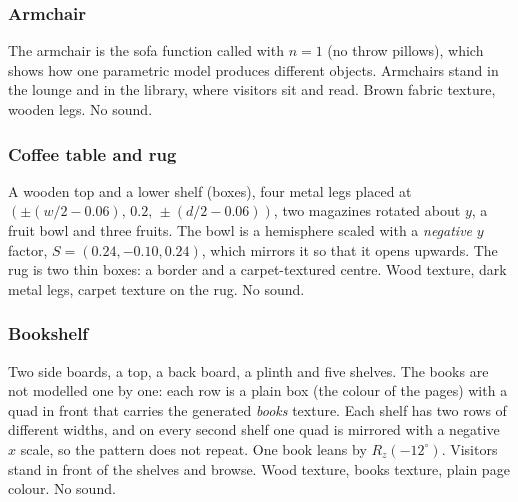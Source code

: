 \subsubsection{Armchair}
 The armchair is the sofa function called with $n=1$ (no throw pillows),
which shows how one parametric model produces different objects. Armchairs stand in the lounge and in the
library, where visitors sit and read.
 Brown fabric texture, wooden legs. No sound.

\subsubsection{Coffee table and rug}
 A wooden top and a lower shelf (boxes), four metal legs placed at
$(\pm(w/2-0.06),\,0.2,\,\pm(d/2-0.06))$, two magazines rotated about $y$, a fruit bowl and three fruits. The bowl
is a hemisphere scaled with a \emph{negative} $y$ factor, $S=(0.24,-0.10,0.24)$, which mirrors it so that it opens
upwards. The rug is two thin boxes: a border and a carpet-textured centre.
 Wood texture, dark metal legs, carpet texture on the rug. No sound.

\subsubsection{Bookshelf}

 Two side boards, a top, a back board, a plinth and five shelves. The books are not
modelled one by one: each row is a plain box (the colour of the pages) with a quad in front that carries the
generated \emph{books} texture. Each shelf has two rows of different widths, and on every second shelf one
quad is mirrored with a negative $x$ scale, so the pattern does not repeat. One book leans by $R_z(-12^\circ)$.
 Visitors stand in front of the shelves and browse.
 Wood texture, books texture, plain page colour. No sound.

